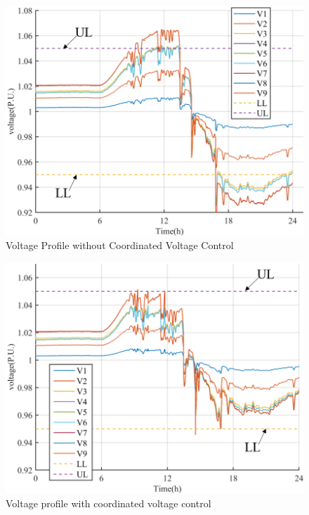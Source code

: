 \begin{figure}[!htb]
\centering
\includegraphics[width=\linewidth]{figs/MNEW_WITHOUT_VVC.png}
\caption{Voltage Profile without Coordinated Voltage Control}
\label{fig:without_vvc}
\end{figure}

\begin{figure}[!htb]
\centering
\includegraphics[width=\linewidth]{figs/MNEW_WITH_VVC.png}
\caption{Voltage profile with coordinated voltage control}
\label{fig:with_cvc}
\end{figure}


